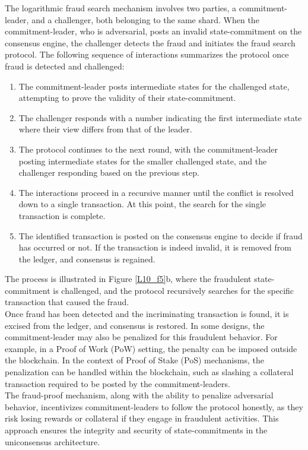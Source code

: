 \begin{enumerate}
	The logarithmic fraud search mechanism involves two parties, a commitment-leader, and a challenger, both belonging to the same shard. When the commitment-leader, who is adversarial, posts an invalid state-commitment on the consensus engine, the challenger detects the fraud and initiates the fraud search protocol. The following sequence of interactions summarizes the protocol once fraud is detected and challenged:\\
	\begin{enumerate}
		\item The commitment-leader posts intermediate states for the challenged state, attempting to prove the validity of their state-commitment.
		\item The challenger responds with a number indicating the first intermediate state where their view differs from that of the leader.
		\item The protocol continues to the next round, with the commitment-leader posting intermediate states for the smaller challenged state, and the challenger responding based on the previous step.
		\item The interactions proceed in a recursive manner until the conflict is resolved down to a single transaction. At this point, the search for the single transaction is complete.
		\item The identified transaction is posted on the consensus engine to decide if fraud has occurred or not. If the transaction is indeed invalid, it is removed from the ledger, and consensus is regained.
	\end{enumerate}
	The process is illustrated in Figure \ref{L10_f5}b, where the fraudulent state-commitment is challenged, and the protocol recursively searches for the specific transaction that caused the fraud.\\
	Once fraud has been detected and the incriminating transaction is found, it is excised from the ledger, and consensus is restored. In some designs, the commitment-leader may also be penalized for this fraudulent behavior. For example, in a Proof of Work (PoW) setting, the penalty can be imposed outside the blockchain. In the context of Proof of Stake (PoS) mechanisms, the penalization can be handled within the blockchain, such as slashing a collateral transaction required to be posted by the commitment-leaders.\\
	The fraud-proof mechanism, along with the ability to penalize adversarial behavior, incentivizes commitment-leaders to follow the protocol honestly, as they risk losing rewards or collateral if they engage in fraudulent activities. This approach ensures the integrity and security of state-commitments in the uniconsensus architecture.
\end{enumerate} 
